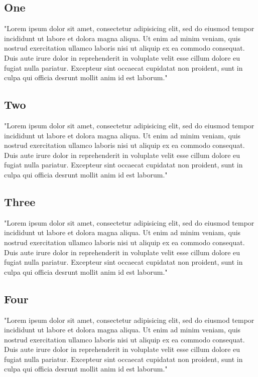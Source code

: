 \documentclass[11pt, twocolumn]{article}
\begin{document}
\subsection{One}
"Lorem ipsum dolor sit amet, consectetur adipisicing elit, sed do eiusmod tempor incididunt ut labore et dolora magna aliqua.  Ut enim ad minim veniam, quis nostrud exercitation ullamco laboris nisi ut aliquip ex ea commodo consequat.  Duis aute irure dolor in reprehenderit in voluplate velit esse cillum dolore eu fugiat nulla pariatur.  Excepteur sint occaecat cupidatat non proident, sunt in culpa qui officia desrunt mollit anim id est laborum."

\subsection{Two}
"Lorem ipsum dolor sit amet, consectetur adipisicing elit, sed do eiusmod tempor incididunt ut labore et dolora magna aliqua.  Ut enim ad minim veniam, quis nostrud exercitation ullamco laboris nisi ut aliquip ex ea commodo consequat.  Duis aute irure dolor in reprehenderit in voluplate velit esse cillum dolore eu fugiat nulla pariatur.  Excepteur sint occaecat cupidatat non proident, sunt in culpa qui officia desrunt mollit anim id est laborum."

\subsection{Three}
"Lorem ipsum dolor sit amet, consectetur adipisicing elit, sed do eiusmod tempor incididunt ut labore et dolora magna aliqua.  Ut enim ad minim veniam, quis nostrud exercitation ullamco laboris nisi ut aliquip ex ea commodo consequat.  Duis aute irure dolor in reprehenderit in voluplate velit esse cillum dolore eu fugiat nulla pariatur.  Excepteur sint occaecat cupidatat non proident, sunt in culpa qui officia desrunt mollit anim id est laborum."

\subsection{Four}
"Lorem ipsum dolor sit amet, consectetur adipisicing elit, sed do eiusmod tempor incididunt ut labore et dolora magna aliqua.  Ut enim ad minim veniam, quis nostrud exercitation ullamco laboris nisi ut aliquip ex ea commodo consequat.  Duis aute irure dolor in reprehenderit in voluplate velit esse cillum dolore eu fugiat nulla pariatur.  Excepteur sint occaecat cupidatat non proident, sunt in culpa qui officia desrunt mollit anim id est laborum."
\end{document}
